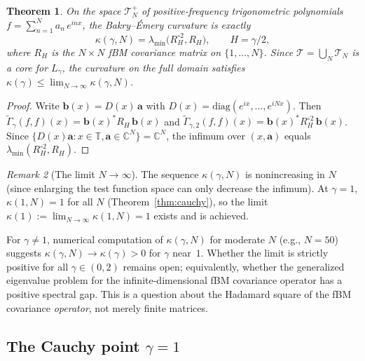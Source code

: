 \documentclass[11pt,a4paper]{article}
\theoremstyle{plain}
\newtheorem{theorem}{Theorem}[section]
\theoremstyle{definition}
\theoremstyle{remark}
\newtheorem{remark}[theorem]{Remark}
\newcommand{\C}{\mathbb{C}}
\newcommand{\T}{\mathbb{T}}
\begin{document}
\begin{theorem}\label{thm:curvature}
On the space $\mathcal{T}_N^+$ of positive-frequency trigonometric
polynomials $f = \sum_{n=1}^N a_n\,e^{inx}$, the Bakry--\'Emery
curvature is exactly
\begin{equation}\label{eq:kappa-def}
  \kappa(\gamma,N) = \lambda_{\min}\!\bigl(R_H^{\circ 2}, R_H\bigr),
  \qquad H = \gamma/2,
\end{equation}
where $R_H$ is the $N \times N$ fBM covariance matrix on $\{1,\ldots,N\}$.
Since $\mathcal{T} = \bigcup_N \mathcal{T}_N$ is a core for $L_\gamma$,
the curvature on the full domain satisfies
$\kappa(\gamma) \leq \lim_{N\to\infty} \kappa(\gamma,N)$.
\end{theorem}

\begin{proof}
Write $\mathbf{b}(x) = D(x)\,\mathbf{a}$ with
$D(x) = \mathrm{diag}(e^{ix},\ldots,e^{iNx})$. Then
$\widetilde{\Gamma}_\gamma(f,f)(x) = \mathbf{b}(x)^* R_H\,\mathbf{b}(x)$
and $\widetilde{\Gamma}_{\gamma,2}(f,f)(x) =
\mathbf{b}(x)^* R_H^{\circ 2}\,\mathbf{b}(x)$.
Since $\{D(x)\mathbf{a} : x \in \T, \mathbf{a} \in \C^N\} = \C^N$,
the infimum over $(x,\mathbf{a})$ equals
$\lambda_{\min}(R_H^{\circ 2}, R_H)$.
\end{proof}

\begin{remark}[The limit $N \to \infty$]
\label{rem:N-limit}
The sequence $\kappa(\gamma,N)$ is nonincreasing in $N$
(since enlarging the test function space can only decrease
the infimum).  At $\gamma = 1$, $\kappa(1,N) = 1$ for all
$N$ (Theorem~\ref{thm:cauchy}), so the limit
$\kappa(1) := \lim_{N\to\infty}\kappa(1,N) = 1$ exists
and is achieved.

For $\gamma \neq 1$, numerical computation of $\kappa(\gamma,N)$
for moderate $N$ (e.g., $N = 50$)
suggests $\kappa(\gamma,N) \to \kappa(\gamma) > 0$ for
$\gamma$ near~$1$.  Whether the limit is strictly positive
for all $\gamma \in (0,2)$ remains open; equivalently,
whether the generalized eigenvalue problem for the
infinite-dimensional fBM covariance operator has a positive
spectral gap.  This is a question about the Hadamard square
of the fBM covariance \emph{operator}, not merely finite
matrices.
\end{remark}


\subsection{The Cauchy point $\gamma = 1$}\label{sec:cauchy}
\end{document}
